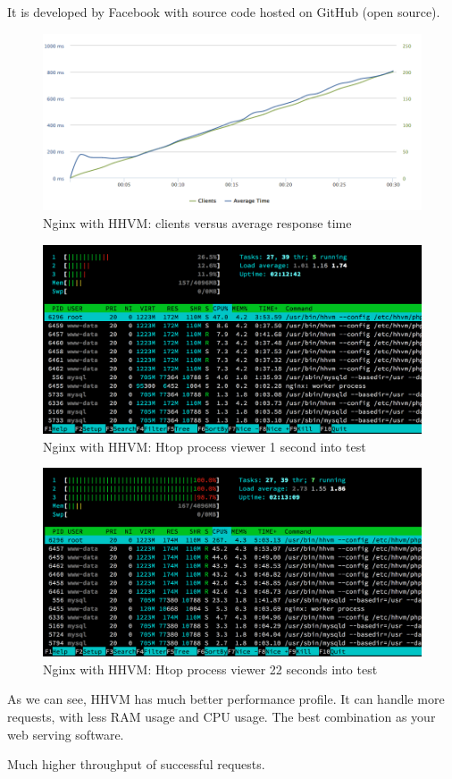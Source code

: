 It is developed by Facebook with source code hosted on GitHub (open source).

\begin{figure}[H]
\begin{center}
\includegraphics[scale=0.5]{figures/Nginx_HHVM.png}
\caption{Nginx with HHVM: clients versus average response time}
\label{fig:nginx_hhvm}
\end{center}
\end{figure}

\begin{figure}[H]
\begin{center}
\includegraphics[scale=0.5]{figures/Nginx_HHVM_1s.png}
\caption{Nginx with HHVM: Htop process viewer 1 second into test}
\label{fig:nginx_hhvm_1s}
\end{center}
\end{figure}

\begin{figure}[H]
\begin{center}
\includegraphics[scale=0.5]{figures/Nginx_HHVM_24s.png}
\caption{Nginx with HHVM: Htop process viewer 22 seconds into test}
\label{fig:nginx_hhvm_24s}
\end{center}
\end{figure}

As we can see, HHVM has much better performance profile. It can handle more requests, with less RAM usage and CPU usage. The best combination as your web serving software. 

Much higher throughput of successful requests.